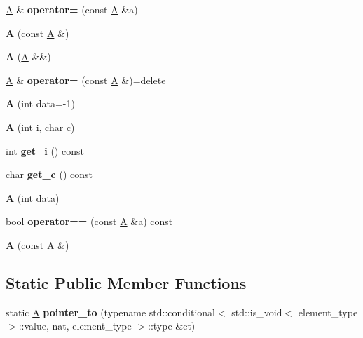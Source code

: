 \begin{DoxyCompactItemize}
\mbox{\hyperlink{struct_a}{A}} \& {\bfseries operator=} (const \mbox{\hyperlink{struct_a}{A}} \&a)
\item 
\mbox{\label{struct_a_aa0f98784263c664c8e73441c1ec951b8}} 
{\bfseries A} (const \mbox{\hyperlink{struct_a}{A}} \&)
\item 
\mbox{\label{struct_a_acca238104bcc99be54892ccc0b10375a}} 
{\bfseries A} (\mbox{\hyperlink{struct_a}{A}} \&\&)
\item 
\mbox{\label{struct_a_ab62f2f61d3952e35b206cba42731e973}} 
\mbox{\hyperlink{struct_a}{A}} \& {\bfseries operator=} (const \mbox{\hyperlink{struct_a}{A}} \&)=delete
\item 
\mbox{\label{struct_a_a2b6d30a161747ae57353d04da8bc3be8}} 
{\bfseries A} (int data=-\/1)
\item 
\mbox{\label{struct_a_ac1f4a5b0c0956f1e4e9643ed1170086d}} 
{\bfseries A} (int i, char c)
\item 
\mbox{\label{struct_a_abb455281c1df2c3b038f6dec7b7f8cae}} 
int {\bfseries get\+\_\+i} () const
\item 
\mbox{\label{struct_a_aa3f0b012af83b74a5d72051081607207}} 
char {\bfseries get\+\_\+c} () const
\item 
\mbox{\label{struct_a_a390d3fed20a414d5453e29eb211e78ad}} 
{\bfseries A} (int data)
\item 
\mbox{\label{struct_a_a988879ac8783cd2e8ae7d6278aef4f5f}} 
bool {\bfseries operator==} (const \mbox{\hyperlink{struct_a}{A}} \&a) const
\item 
\mbox{\label{struct_a_aa0f98784263c664c8e73441c1ec951b8}} 
{\bfseries A} (const \mbox{\hyperlink{struct_a}{A}} \&)
\end{DoxyCompactItemize}
\subsection*{Static Public Member Functions}
\begin{DoxyCompactItemize}
\item 
\mbox{\label{struct_a_a7418212e03e6166131547af5f57c8de6}} 
static \mbox{\hyperlink{struct_a}{A}} {\bfseries pointer\+\_\+to} (typename std\+::conditional$<$ std\+::is\+\_\+void$<$ element\+\_\+type $>$\+::value, nat, element\+\_\+type $>$\+::type \&et)
\end{DoxyCompactItemize}
